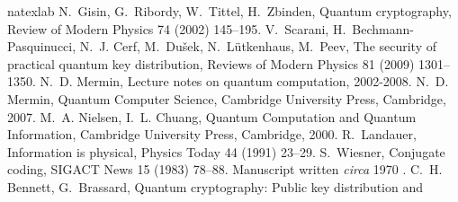\documentclass[12pt]{elsarticle}%
\begin{document}
\begin{thebibliography}{50}
\expandafter\ifx\csname natexlab\endcsname\relax\def\natexlab#1{#1}\fi
\providecommand{\bibinfo}[2]{#2}
\ifx\xfnm\relax \def\xfnm[#1]{\unskip,\space#1}\fi
\bibinfo{author}{N.~Gisin}, \bibinfo{author}{G.~Ribordy},
  \bibinfo{author}{W.~Tittel}, \bibinfo{author}{H.~Zbinden},
\newblock \bibinfo{title}{Quantum cryptography},
\newblock \bibinfo{journal}{Review of Modern Physics} \bibinfo{volume}{74}
  (\bibinfo{year}{2002}) \bibinfo{pages}{145--195}.
\bibinfo{author}{V.~Scarani}, \bibinfo{author}{H.~Bechmann-Pasquinucci},
  \bibinfo{author}{N.~J. Cerf}, \bibinfo{author}{M.~Du\v{s}ek},
  \bibinfo{author}{N.~L{\"u}tkenhaus}, \bibinfo{author}{M.~Peev},
\newblock \bibinfo{title}{The security of practical quantum key distribution},
\newblock \bibinfo{journal}{Reviews of Modern Physics} \bibinfo{volume}{81}
  (\bibinfo{year}{2009}) \bibinfo{pages}{1301--1350}.
\bibinfo{author}{N.~D. Mermin}, \bibinfo{title}{Lecture notes on quantum
  computation}, \bibinfo{year}{2002-2008}.
\bibinfo{author}{N.~D. Mermin}, \bibinfo{title}{Quantum Computer Science},
  \bibinfo{publisher}{Cambridge University Press},
  \bibinfo{address}{Cambridge}, \bibinfo{year}{2007}.
\bibinfo{author}{M.~A. Nielsen}, \bibinfo{author}{I.~L. Chuang},
  \bibinfo{title}{Quantum Computation and Quantum Information},
  \bibinfo{publisher}{Cambridge University Press},
  \bibinfo{address}{Cambridge}, \bibinfo{year}{2000}.
\bibinfo{author}{R.~Landauer},
\newblock \bibinfo{title}{Information is physical},
\newblock \bibinfo{journal}{Physics Today} \bibinfo{volume}{44}
  (\bibinfo{year}{1991}) \bibinfo{pages}{23--29}.
\bibinfo{author}{S.~Wiesner},
\newblock \bibinfo{title}{Conjugate coding},
\newblock \bibinfo{journal}{SIGACT News} \bibinfo{volume}{15}
  (\bibinfo{year}{1983}) \bibinfo{pages}{78--88}. \bibinfo{note}{Manuscript
  written {\it circa} 1970 \cite[Ref.~27]{benn-92}}.
\bibinfo{author}{C.~H. Bennett}, \bibinfo{author}{G.~Brassard},
\newblock \bibinfo{title}{Quantum cryptography: Public key distribution and
}
\end{thebibliography}
\end{document}

